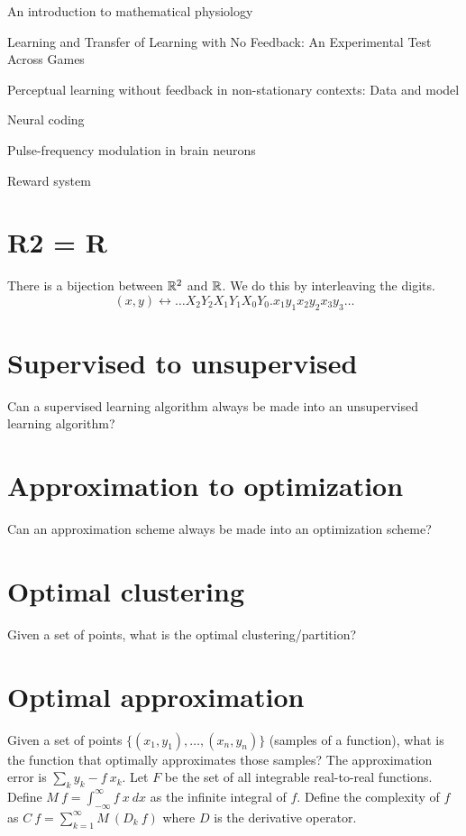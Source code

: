 An introduction to mathematical physiology

Learning and Transfer of Learning with No Feedback: An Experimental Test Across Games

Perceptual learning without feedback in non-stationary contexts: Data and model

Neural coding

Pulse-frequency modulation in brain neurons

Reward system

\section{R2 = R}

There is a bijection between \(\mathbb{R}^2\) and \(\mathbb{R}\).
We do this by interleaving the digits.
\[
    (x, y) \leftrightarrow \ldots X_2 Y_2 X_1 Y_1 X_0 Y_0 . x_1 y_1 x_2 y_2 x_3 y_3 \ldots
\]

\section{Supervised to unsupervised}

Can a supervised learning algorithm always be made into an unsupervised learning algorithm?

\section{Approximation to optimization}

Can an approximation scheme always be made into an optimization scheme?

\section{Optimal clustering}

Given a set of points, what is the optimal clustering/partition?

\section{Optimal approximation}

Given a set of points
\(\{(x_1,y_1),\ldots,(x_n,y_n)\}\)
(samples of a function),
what is the function that optimally approximates those samples?
The approximation error is \(\sum_k y_k - f~x_k \).
Let \(F\) be the set of all integrable real-to-real functions.
Define \(M~f = \int_{-\infty}^\infty f~x~dx\) as the infinite integral of \(f\).
Define the complexity of \(f\)
as \(C~f = \sum_{k=1}^\infty M~(D_k~f)\)
where \(D\) is the derivative operator.

